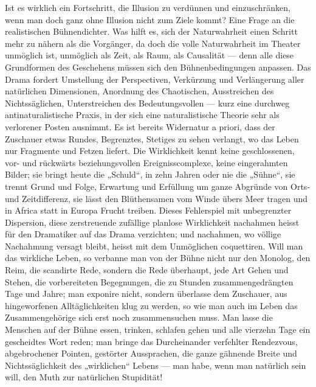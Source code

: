 Ist es wirklich ein Fortschritt, die Illusion zu verdünnen und einzuschränken, wenn man doch ganz ohne Illusion nicht zum Ziele kommt? Eine Frage an die realistischen Bühnendichter. Was hilft es, sich der Naturwahrheit einen Schritt mehr zu nähern als die Vorgänger, da doch die volle Naturwahrheit im Theater unmöglich ist, unmöglich als Zeit, als Raum, als Causalität — denn alle diese Grundformen des Geschehens müssen sich den Bühnenbedingungen anpassen. Das Drama fordert Umstellung der Perspectiven, Verkürzung und Verlängerung aller natürlichen Dimensionen, Anordnung des Chaotischen, Ausstreichen des Nichtssäglichen, Unterstreichen des Bedeutungsvollen — kurz eine durchweg antinaturalistische Praxis, in der sich eine naturalistische Theorie sehr als verlorener Posten ausnimmt. Es ist bereits Widernatur a priori, dass der Zuschauer etwas Rundes, Begrenztes, Stetiges zu sehen verlangt, wo das Leben nur Fragmente und Fetzen liefert. Die Wirklichkeit kennt keine geschlossenen, vor- und rückwärts beziehungsvollen Ereignisscomplexe, keine eingerahmten Bilder; sie bringt heute die „Schuld“, in zehn Jahren oder nie die „Sühne“, sie trennt Grund und Folge, Erwartung und Erfüllung um ganze Abgründe von Orts- und Zeitdifferenz, sie lässt den Blüthensamen vom Winde übers Meer tragen und in Africa statt in Europa Frucht treiben. Dieses Fehlerspiel mit unbegrenzter Dispersion, diese zerstreuende zufällige planlose Wirklichkeit nachahmen heisst für den Dramatiker auf das Drama verzichten; und  nachahmen, wo völlige Nachahmung versagt bleibt, heisst mit dem Unmöglichen coquettiren. Will man das wirkliche Leben, so verbanne man von der Bühne nicht nur den Monolog, den Reim, die scandirte Rede, sondern die Rede überhaupt, jede Art Gehen und Stehen, die vorbereiteten Begegnungen, die zu Stunden zusammengedrängten Tage und Jahre; man exponire nicht, sondern überlasse dem Zuschauer, aus hingeworfenen Alltäglichkeiten klug zu werden, so wie man auch im Leben das Zusammengehörige sich erst noch zusammensuchen muss. Man lasse die Menschen auf der Bühne essen, trinken, schlafen gehen und alle vierzehn Tage ein gescheidtes Wort reden; man bringe das Durcheinander verfehlter Rendezvous, abgebrochener Pointen, gestörter Aussprachen, die ganze gähnende Breite und Nichtssäglichkeit des „wirklichen“ Lebens — man habe, wenn man natürlich sein will, den Muth zur natürlichen Stupidität!
\par

